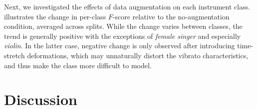 \documentclass{article}
\begin{document}
Next, we investigated the effects of data augmentation on each instrument class.
 illustrates the change in per-class $F$-score relative to the
no-augmentation condition, averaged across splits.
While the change varies between classes, the trend is generally positive
with the exceptions of \emph{female singer} and especially \emph{violin}.
In the latter case, negative change is only observed after introducing time-stretch
deformations, which may unnaturally distort the vibrato characteristics,
and thus make the class more difficult to model.

\section{Discussion}



\end{document}
